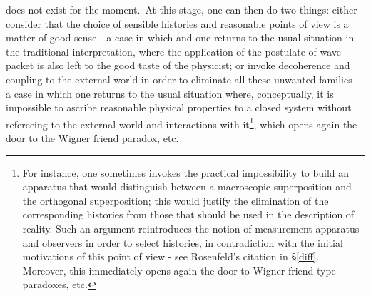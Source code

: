 \documentclass[12pt,onecolumn]{article}%
\begin{document}
does not exist for the moment.\ At this stage, one can then do two things:
either consider that the choice of sensible histories and reasonable points of
view is a matter of good sense - a case in which and one returns to the usual
situation in the traditional interpretation, where the application of the
postulate of wave packet is also left to the good taste of the physicist; or
invoke decoherence and coupling to the external world in order to eliminate
all these unwanted families - a case in which one returns to the usual
situation where, conceptually, it is impossible to ascribe reasonable physical
properties to a closed system without refereeing to the external world and
interactions with it\footnote{For instance, one sometimes invokes the
practical impossibility to build an apparatus that would distinguish between a
macroscopic superposition and the orthogonal superposition; this would justify
the elimination of the corresponding histories from those that should be used
in the description of reality. Such an argument reintroduces the notion of
measurement apparatus and observers in order to select histories, in
contradiction with the initial motivations of this point of view - see
Rosenfeld's citation in \S \ref{diff}. Moreover, this immediately opens again
the door to Wigner friend type paradoxes, etc.}, which opens again the door to
the Wigner friend paradox, etc.
\end{document}
